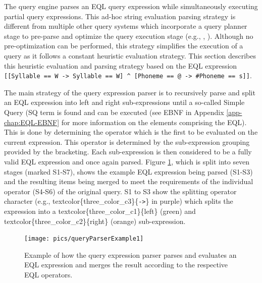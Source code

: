 \documentclass[]{book}
\begin{document}
The query engine parses an EQL query expression while simultaneously executing partial query expressions. This ad-hoc string evaluation parsing strategy is different from multiple other query systems which incorporate a query planner stage to pre-parse and optimize the query execution stage (e.g., \citet{hipp:2007a}, \citet{conway:2016a}). Although no pre-optimization can be performed, this strategy simplifies the execution of a query as it follows a constant heuristic evaluation strategy. This section describes this heuristic evaluation and parsing strategy based on the EQL expression \texttt{{[}{[}Syllable\ ==\ W\ -\textgreater{}\ Syllable\ ==\ W{]}\ \^{}\ {[}Phoneme\ ==\ @\ -\textgreater{}\ \#Phoneme\ ==\ s{]}{]}}.

The main strategy of the query expression parser is to recursively parse and split an EQL expression into left and right sub-expressions until a so-called Simple Query (SQ term is found and can be executed (see EBNF in Appendix \ref{app-chap:EQL-EBNF} for more information on the elements comprising the EQL). This is done by determining the operator which is the first to be evaluated on the current expression. This operator is determined by the sub-expression grouping provided by the bracketing. Each sub-expression is then considered to be a fully valid EQL expression and once again parsed. Figure \ref{fig:query-queryParserExample1}, which is split into seven stages (marked S1-S7), shows the example EQL expression being parsed (S1-S3) and the resulting items being merged to meet the requirements of the individual operator (S4-S6) of the original query. S1 to S3 show the splitting operator character (e.g., textcolor\{three\_color\_c3\}\{\texttt{-\textgreater{}}\} in purple) which splits the expression into a textcolor\{three\_color\_c1\}\{left\} (green) and textcolor\{three\_color\_c2\}\{right\} (orange) sub-expression.

\begin{figure}

{\centering \texttt{[image: pics/queryParserExample1]} 

}

\caption{Example of how the query expression parser parses and evaluates an EQL expression and merges the result according to the respective EQL operators.}\label{fig:query-queryParserExample1}
\end{figure}
\end{document}
